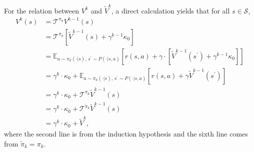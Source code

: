 \documentclass[10pt]{article}
\newcommand{\calS}{\mathcal{S}}
\newcommand{\calT}{\mathcal{T}}
\newcommand{\E}{\mathbb{E}}
\theoremstyle{plain}
\theoremstyle{definition}
\begin{document}
For the relation between $V^k$ and $\tilde{V}^k$, a direct calculation yields that for all $s\in\mathcal{S}$,
\begin{align*}
    V^{k}(s) &= \calT^{\pi_{k}} V^{k-1}(s) \\
    &= \calT^{\pi_k} [\tilde{V}^{k-1}(s) + \gamma^{k-1} \kappa_0] \\
    &= \E_{a\sim\pi_k(\cdot|s), \, s^\prime\sim P(\cdot|s,a)} [r(s,a) + \gamma \cdot [\tilde{V}^{k-1}(s^\prime) + \gamma^{k-1} \kappa_0]] \\
    &= \gamma^k \cdot \kappa_0 + \E_{a\sim\pi_k(\cdot|s), \, s^\prime\sim P(\cdot|s,a)} [r(s,a) + \gamma \tilde{V}^{k-1}(s^\prime)] \\
    &= \gamma^k \cdot \kappa_0 + \calT^{\pi_k} \tilde{V}^{k-1}(s) \\
    &= \gamma^k \cdot \kappa_0 + \calT^{\tilde{\pi}_k} \tilde{V}^{k-1}(s) \\
    &= \gamma^k \cdot \kappa_0 + \tilde{V}^k,
\end{align*}
where the second line is from the induction hypothesis and the sixth line comes from $\tilde{\pi}_k = \pi_k$. %
\end{document}
